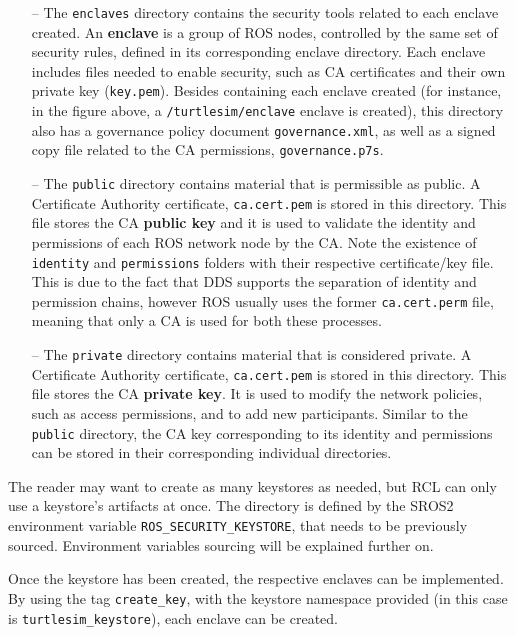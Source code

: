 \begin{itemize}
    \item[--] The \texttt{enclaves} directory contains the security tools related to each enclave created. An \textbf{enclave} is a group of ROS nodes, controlled by the same set of security rules, defined in its corresponding enclave directory. Each enclave includes files needed to enable security, such as CA certificates and their own private key (\texttt{key.pem}). Besides containing each enclave created (for instance, in the figure above, a \texttt{/turtlesim/enclave} enclave is created), this directory also has a governance policy document \texttt{governance.xml}, as well as a signed copy file related to the CA permissions, \texttt{governance.p7s}. 
    \item[--] The \texttt{public} directory contains material that is permissible as public. A Certificate Authority certificate, \texttt{ca.cert.pem} is stored in this directory. This file stores the CA \textbf{public key} and it is used to validate the identity and permissions of each ROS network node by the CA. Note the existence of \texttt{identity} and \texttt{permissions} folders with their respective certificate/key file. This is due to the fact that DDS supports the separation of identity and permission chains, however ROS usually uses the former \texttt{ca.cert.perm} file, meaning that only a CA is used for both these processes.
    \item[--] The \texttt{private} directory contains material that is considered private. A Certificate Authority certificate, \texttt{ca.cert.pem} is stored in this directory. This file stores the CA \textbf{private key}. It is used to modify the network policies, such as access permissions, and to add new participants. Similar to the \texttt{public} directory, the CA key corresponding to its identity and permissions can be stored in their corresponding individual directories.
\end{itemize}
            
The reader may want to create as many keystores as needed, but RCL can only use a keystore's artifacts at once. The directory is defined by the SROS2 environment variable \texttt{ROS\_SECURITY\_KEYSTORE}, that needs to be previously sourced. Environment variables sourcing will be explained further on.

Once the keystore has been created, the respective enclaves can be implemented. By using the tag \texttt{create\_key}, with the keystore namespace provided (in this case is \texttt{turtlesim\_keystore}), each enclave can be created.

